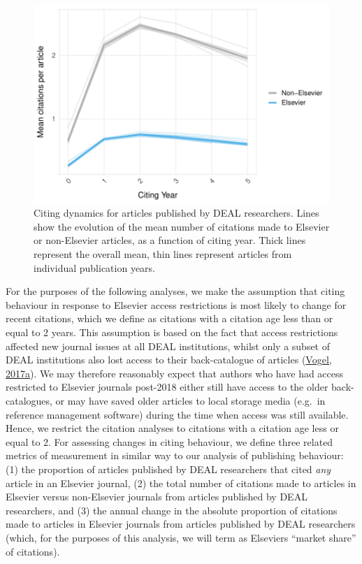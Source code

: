 \documentclass[
]{article}
\begin{document}
\begin{figure}

{\centering \includegraphics[width=0.5\linewidth]{analysis_files/figure-latex/references-publisher-year-cityear-1} 

}

\caption{Citing dynamics for articles published by DEAL researchers. Lines show the evolution of the mean number of citations made to Elsevier or non-Elsevier articles, as a function of citing year. Thick lines represent the overall mean, thin lines represent articles from individual publication years.}\label{fig:references-publisher-year-cityear}
\end{figure}

For the purposes of the following analyses, we make the assumption that citing behaviour in response to Elsevier access restrictions is most likely to change for recent citations, which we define as citations with a citation age less than or equal to 2 years. This assumption is based on the fact that access restrictions affected new journal issues at all DEAL institutions, whilst only a subset of DEAL institutions also lost access to their back-catalogue of articles (\href{https://doi.org/10.1126/science.355.6320.17}{Vogel, 2017a}). We may therefore reasonably expect that authors who have had access restricted to Elsevier journals post-2018 either still have access to the older back-catalogues, or may have saved older articles to local storage media (e.g.~in reference management software) during the time when access was still available. Hence, we restrict the citation analyses to citations with a citation age less or equal to 2. For assessing changes in citing behaviour, we define three related metrics of measurement in similar way to our analysis of publishing behaviour: (1) the proportion of articles published by DEAL researchers that cited \emph{any} article in an Elsevier journal, (2) the total number of citations made to articles in Elsevier versus non-Elsevier journals from articles published by DEAL researchers, and (3) the annual change in the absolute proportion of citations made to articles in Elsevier journals from articles published by DEAL researchers (which, for the purposes of this analysis, we will term as Elsevier\textquotesingle s ``market share'' of citations).
\end{document}
